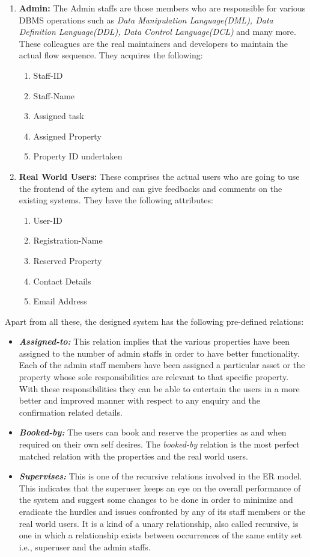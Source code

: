 \documentclass[12pt]{report}
\begin{document}
\begin{enumerate}
\begin{enumerate}
\item \textbf{Admin:} The Admin staffs are those members who are responsible for various DBMS operations such as \textit{Data Manipulation Language(DML), Data Definition Language(DDL), Data Control Language(DCL)} and many more. These colleagues are the real maintainers and developers to maintain the actual flow sequence.
They acquires the following:
 \begin{enumerate}
\item Staff-ID
\item Staff-Name
\item Assigned task
\item Assigned Property
\item Property ID undertaken  
\end{enumerate}
\item \textbf{Real World Users:} These comprises the actual users who are going to use the frontend of the sytem and can give feedbacks and comments on the existing systems. They have the following attributes:
 \begin{enumerate}
\item User-ID
\item Registration-Name
\item Reserved Property
\item Contact Details
\item Email Address  
\end{enumerate}
\end{enumerate}
   
\end{enumerate} 

Apart from all these, the designed system has the following pre-defined relations:
\begin{itemize}
\item \textbf{\textit{Assigned-to:}} This relation implies that the various properties have been assigned to the number of admin staffs in order to have better functionality. Each of the admin staff members have been assigned a particular asset or the property whose sole responsibilities are relevant to that specific property. With these responsibilities they can be able to entertain the users in a more better and improved manner with respect to any enquiry and the confirmation related details.
\item \textbf{\textit{Booked-by:}} The users can book and reserve the properties as and when required on their own self desires. The \textit{booked-by} relation is the most perfect matched relation with the properties and the real world users. 
\item \textbf{\textit{Supervises:}} This is one of the recursive relations involved in the ER model. This indicates that the superuser keeps an eye on the overall performance of the system and suggest some changes to be done in order to minimize and eradicate the hurdles and issues confronted by any of its staff members or the real world users. It is a kind of a unary relationship, also called recursive, is one in which a relationship exists between occurrences of the same entity set i.e., superuser and the admin staffs.
\end{itemize}
\end{document}
